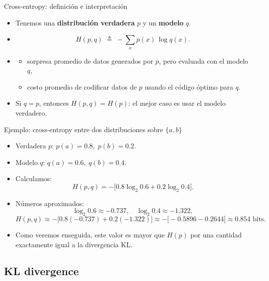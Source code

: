 \begin{frame}{Cross-entropy: definición e interpretación}
\begin{itemize}
  \item Tenemos una \textbf{distribución verdadera} \(p\) y un \textbf{modelo} \(q\).
  \item {}
  \[
    H(p,q) \;\triangleq\; -\sum_{x} p(x)\,\log q(x).
  \]
  \item {}
  \begin{itemize}
    \item sorpresa promedio de datos generados por \(p\), pero evaluada con el modelo \(q\),
    \item costo promedio de codificar datos de \(p\) usando el código óptimo para \(q\).
  \end{itemize}
  \item Si \(q=p\), entonces \(H(p,q)=H(p)\): el mejor caso es usar el modelo verdadero.
\end{itemize}
\end{frame}

\begin{frame}{Ejemplo: cross-entropy entre dos distribuciones sobre \(\{a,b\}\)}
\begin{itemize}
  \item Verdadera \(p\): \quad \(p(a)=0.8,\;p(b)=0.2\).
  \item Modelo \(q\): \quad \(q(a)=0.6,\;q(b)=0.4\).
  \item Calculamos:
  \[
    H(p,q) = -\big[0.8\log_2 0.6 + 0.2\log_2 0.4\big].
  \]
  \item Números aproximados:
  \[
    \log_2 0.6 \approx -0.737,\quad \log_2 0.4 \approx -1.322,
  \]
  \[
    H(p,q) \approx -\big[0.8(-0.737) + 0.2(-1.322)\big]
             \approx -\big[-0.5896 -0.2644\big]
             \approx 0.854 \text{ bits.}
  \]
  \item Como veremos enseguida, este valor es mayor que \(H(p)\) por una cantidad exactamente igual a la divergencia KL.
\end{itemize}
\end{frame}

\subsection{KL divergence}

